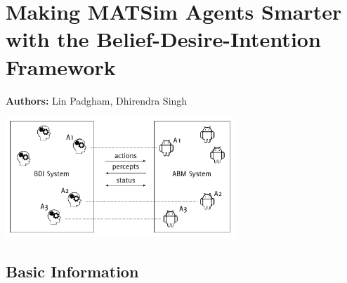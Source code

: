 \chapter{Making MATSim Agents Smarter with the Belief-Desire-Intention Framework}
\label{ch:bdi}

\hfill \textbf{Authors:} Lin Padgham, Dhirendra Singh

\begin{center} \includegraphics[width=0.65\textwidth, angle=0]{extending/figures/bdi/title.png} \end{center}



\section{Basic Information}


